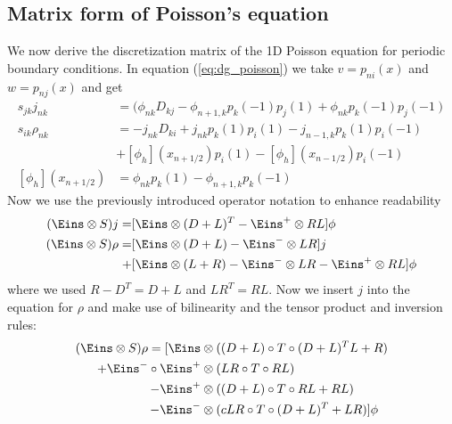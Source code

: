 \documentclass[a4paper,12pt]{scrartcl}
\begin{document}
\subsection{Matrix form of Poisson's equation}
We now derive the discretization matrix of the 1D Poisson equation for periodic
boundary conditions.
In equation (\ref{eq:dg_poisson}) we take $v=p_{ni}(x)$ and  $w=p_{nj}(x)$ 
and get
\begin{subequations}
    \begin{align}
        s_{jk} j_{nk} &=  (\phi_{nk}D_{kj} - \phi_{n+1,k}p_k(-1)p_j(1) + \phi_{nk}p_k(-1)p_j(-1)\\
        s_{ik} \rho_{nk} &= -j_{nk} D_{ki} + j_{nk}p_k(1)p_i(1) - j_{n-1,k}p_k(1)p_i(-1) \nonumber \\
         &+ [\phi_h](x_{n+1/2}) p_i(1) - [\phi_h](x_{n-1/2})p_i(-1) \\
        [\phi_h](x_{n+1/2}) &= \phi_{nk}p_k(1) - \phi_{n+1,k}p_k(-1)
        \label{ eq:projection}
    \end{align}
\end{subequations}
Now we use the previously introduced operator notation to enhance readability
\begin{subequations}
    \begin{align}
        (\Eins \otimes S)j =& [\Eins\otimes (D+L)^T - \Eins^{+} \otimes RL] \phi \\
        (\Eins \otimes S)\rho %
                =& [\Eins\otimes (D+L) - \Eins^-\otimes LR]j \nonumber \\
                +& [\Eins\otimes (L+R) - \Eins^{-}\otimes LR  - \Eins^{+} \otimes RL] \phi
    \end{align}
    \label{eq:projection_operator_notation}
\end{subequations}
where we used $R-D^T = D+L$ and $LR^T = RL$. Now we insert $j$ into the equation
for $\rho$ and make use of bilinearity and the tensor product and inversion rules:
\begin{align}
    (\Eins\otimes S)\rho = 
    [\Eins&\otimes( (D+L)\circ T\circ (D+L)^T  L + R) \nonumber \\
            + \Eins^-\circ\Eins^+&\otimes (LR\circ T\circ RL) \nonumber \\
            - \Eins^+&\otimes ((D+L)\circ T \circ RL + RL) \nonumber \\
            - \Eins^-&\otimes (cLR\circ T\circ (D+L)^T + LR )]\phi
    \label{eq:laplace_operator}
\end{align}
\end{document}
